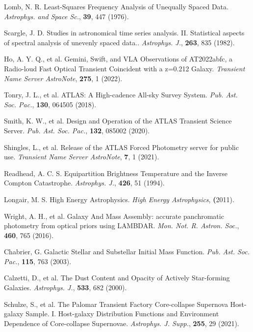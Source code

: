 \documentclass{nature_plusfigure}
\newcommand{\mn}{{Mon. Not. R. Astron. Soc.}}
\newcommand{\mnras}{\mn}
\newcommand{\apj}{{Astrophys. J.}}
\newcommand{\apjs}{{Astrophys. J. Supp.}}
\newcommand{\apss}{{Astrophys. and Space Sc.}}
\newcommand{\pasp}{{Pub. Ast. Soc. Pac.}}
\begin{document}
\begin{methods}
\begin{thebibliography}{10}

 Lomb, N. R. Least-Squares Frequency Analysis of Unequally Spaced Data. \emph{\apss}, \textbf{39}, 447 (1976). 

 Scargle, J. D. Studies in astronomical time series analysis. II. Statistical aspects of spectral analysis of unevenly spaced data.. \emph{\apj}, \textbf{263}, 835 (1982). 


 Ho, A. Y. Q., et al. Gemini, Swift, and VLA Observations of AT2022abfc, a Radio-loud Fast Optical Transient Coincident with a z=0.212 Galaxy. \emph{Transient Name Server AstroNote}, \textbf{275}, 1 (2022). 

  Tonry, J. L., et al. ATLAS: A High-cadence All-sky Survey System. \emph{\pasp}, \textbf{130}, 064505 (2018). 

 Smith, K. W., et al. Design and Operation of the ATLAS Transient Science Server. \emph{\pasp}, \textbf{132}, 085002 (2020). 

 Shingles, L., et al. Release of the ATLAS Forced Photometry server for public use. \emph{Transient Name Server AstroNote}, \textbf{7}, 1 (2021). 

 Readhead, A. C. S. Equipartition Brightness Temperature and the Inverse Compton Catastrophe. \emph{\apj}, \textbf{426}, 51 (1994). 

  Longair, M. S. High Energy Astrophysics. \emph{High Energy Astrophysics}, \textbf (2011). 
 
 
  Wright, A. H., et al. Galaxy And Mass Assembly: accurate panchromatic photometry from optical priors using LAMBDAR. \emph{\mnras}, \textbf{460}, 765 (2016). 
 
   Chabrier, G. Galactic Stellar and Substellar Initial Mass Function. \emph{\pasp}, \textbf{115}, 763 (2003). 

 Calzetti, D., et al. The Dust Content and Opacity of Actively Star-forming Galaxies. \emph{\apj}, \textbf{533}, 682 (2000). 

 Schulze, S., et al. The Palomar Transient Factory Core-collapse Supernova Host-galaxy Sample. I. Host-galaxy Distribution Functions and Environment Dependence of Core-collapse Supernovae. \emph{\apjs}, \textbf{255}, 29 (2021). 


\end{thebibliography}
\end{methods}
\end{document}
